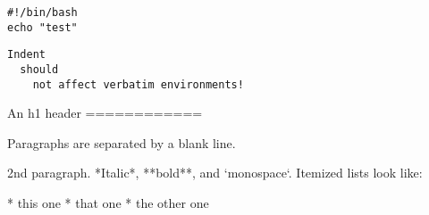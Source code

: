 \begin{verbatim}
#!/bin/bash
echo "test"
    \end{verbatim}

  \begin{lstlisting}
Indent
  should
    not affect verbatim environments!
    \end{lstlisting}

  \begin{markdown}
An h1 header
============

Paragraphs are separated by a blank line.

2nd paragraph.
*Italic*, **bold**, and `monospace`.
Itemized lists look like:

* this one
* that one
* the other one
 \end{markdown}
